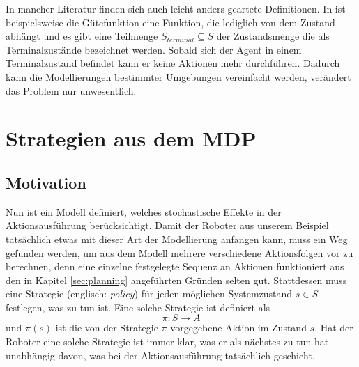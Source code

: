 \documentclass[a4paper]{IEEEtran}
\begin{document}
In mancher Literatur finden sich auch leicht anders geartete Definitionen. In \cite{russell1995artificial} ist beispielsweise die Gütefunktion eine Funktion, die lediglich von dem Zustand abhängt und es gibt eine Teilmenge $S_{terminal} \subseteq S$ der Zustandsmenge die als Terminalzustände bezeichnet werden. Sobald sich der Agent in einem Terminalzustand befindet kann er keine Aktionen mehr durchführen. Dadurch kann die Modellierungen bestimmter Umgebungen vereinfacht werden, verändert das Problem nur unwesentlich.


\section{Strategien aus dem MDP}
\subsection{Motivation}
Nun ist ein Modell definiert, welches stochastische Effekte in der Aktionsausführung berücksichtigt. Damit der Roboter aus unserem Beispiel tatsächlich etwas mit dieser Art der Modellierung anfangen kann, muss ein Weg gefunden werden, um aus dem Modell mehrere verschiedene Aktionsfolgen vor zu berechnen, denn eine einzelne festgelegte Sequenz an Aktionen funktioniert aus den in Kapitel \ref{sec:planning} angeführten Gründen selten gut. Stattdessen muss eine Strategie (englisch: \emph{policy}) für jeden möglichen Systemzustand $s \in S$ festlegen, was zu tun ist. Eine solche Strategie ist definiert als
\begin{equation}
	\pi:S \rightarrow A
	\label{eq:policy}
\end{equation}
und $\pi(s)$ ist die von der Strategie $\pi$ vorgegebene Aktion im Zustand $s$. Hat der Roboter eine solche Strategie ist immer klar, was er als nächstes zu tun hat - unabhängig davon, was bei der Aktionsausführung tatsächlich geschieht.
\end{document}
